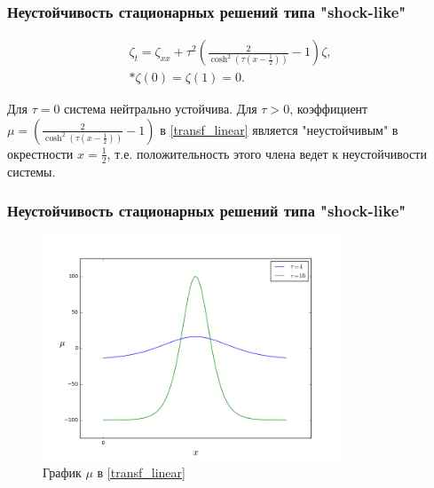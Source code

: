 \documentclass{beamer}
\begin{document}
\begin{frame}
    \frametitle{Неустойчивость стационарных решений типа "shock-like"}

    \begin{block}{}
        \begin{gather} \label{transf_linear}
            \zeta_t = \zeta_{xx} + \tau^2 \left( \frac{2}{\cosh^2(\tau(x -
            \frac{1}{2}))} - 1 \right) \zeta, \\* 
            \zeta(0) = \zeta(1) = 0.
        \end{gather}
    \end{block}
    Для $\tau = 0$ система нейтрально устойчива. Для $\tau > 0$, коэффициент 
    $\mu = \left(\frac{2}{\cosh^2(\tau(x - \frac{1}{2}))} - 1 \right)$  в 
    \eqref{transf_linear} является "неустойчивым" в окрестности 
    $x = \frac{1}{2}$, т.е. положительность этого члена ведет к
    неустойчивости системы.

\end{frame}

\begin{frame}
    \frametitle{Неустойчивость стационарных решений типа "shock-like"}

    \begin{figure}[H]
        \centering
        \includegraphics[width=3.5in]{fig2}
        \caption{График $\mu$ в \eqref{transf_linear}}
    \end{figure}

\end{frame}
\end{document}
